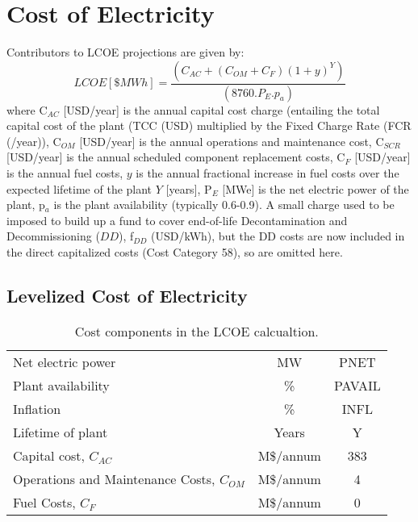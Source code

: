 \newpage 

\section{Cost of Electricity} 

 Contributors to LCOE projections are given by: 
 \begin{equation} 
 LCOE [\$ MWh] = \frac{(C_{AC} + (C_{OM} + C_{F})(1+y)^Y)}{(8760.P_E.p_a)} 
 \label{eq:coe}
\end{equation} 
where C$_{AC}$ [USD/year] is the annual capital cost charge (entailing the total capital cost of the plant (TCC (USD) multiplied by the Fixed Charge Rate (FCR (/year)), C$_{OM}$ [USD/year] is the annual operations and maintenance cost, C$_{SCR}$ [USD/year] is the annual scheduled component replacement costs, C$_{F}$ [USD/year] is the annual fuel costs, $y$ is the annual fractional increase in fuel costs over the expected lifetime of the plant $Y$ [years], P$_{E}$ [MWe] is the net electric power of the plant, p$_{a}$ is the plant availability (typically 0.6-0.9).  A small charge used to be imposed to build up a fund to cover end-of-life Decontamination and Decommissioning ($DD$), f$_{DD}$ (USD/kWh), but the DD costs are now included in the direct capitalized costs (Cost Category 58), so are omitted here.





\subsection{Levelized Cost of Electricity} 

\begin{table}[h!] 
\begin{tabular}{l c c } 
Net electric power & MW & PNET \\
Plant availability & \% & PAVAIL \\
Inflation & \% & INFL \\
Lifetime of plant & Years & Y \\
Capital cost, $C_{AC}$ &     M\$/annum    &    383      \\ 
Operations and Maintenance Costs, $C_{OM}$ & M\$/annum  &      4 \\ 
Fuel Costs, $C_{F}$ & M\$/annum  &       0 \\ 
    \end{tabular} 
    \caption{Cost components in the LCOE calcualtion.}
    \label{tab:lcoe} 
\end{table} 

